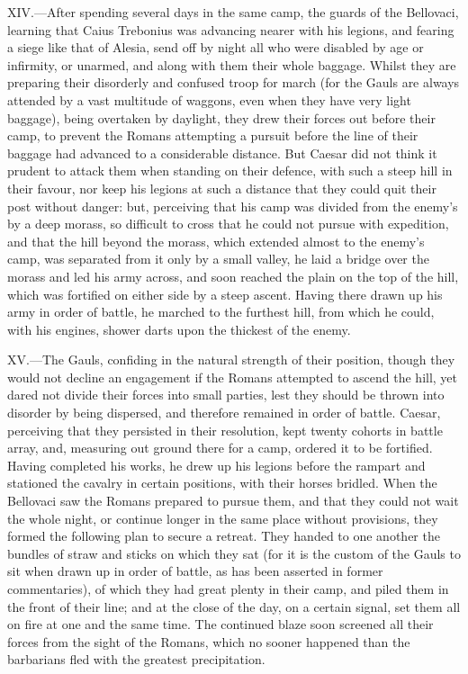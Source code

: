 XIV.—After spending several days in the same camp, the guards of the
Bellovaci, learning that Caius Trebonius was advancing nearer with his
legions, and fearing a siege like that of Alesia, send off by night all
who were disabled by age or infirmity, or unarmed, and along with them
their whole baggage. Whilst they are preparing their disorderly and
confused troop for march (for the Gauls are always attended by a vast
multitude of waggons, even when they have very light baggage), being
overtaken by daylight, they drew their forces out before their camp, to
prevent the Romans attempting a pursuit before the line of their baggage
had advanced to a considerable distance. But Caesar did not think it
prudent to attack them when standing on their defence, with such a steep
hill in their favour, nor keep his legions at such a distance that they
could quit their post without danger: but, perceiving that his camp was
divided from the enemy's by a deep morass, so difficult to cross that he
could not pursue with expedition, and that the hill beyond the morass,
which extended almost to the enemy's camp, was separated from it only by
a small valley, he laid a bridge over the morass and led his army
across, and soon reached the plain on the top of the hill, which was
fortified on either side by a steep ascent. Having there drawn up his
army in order of battle, he marched to the furthest hill, from which he
could, with his engines, shower darts upon the thickest of the enemy.

XV.—The Gauls, confiding in the natural strength of their position,
though they would not decline an engagement if the Romans attempted to
ascend the hill, yet dared not divide their forces into small parties,
lest they should be thrown into disorder by being dispersed, and
therefore remained in order of battle. Caesar, perceiving that they
persisted in their resolution, kept twenty cohorts in battle array, and,
measuring out ground there for a camp, ordered it to be fortified.
Having completed his works, he drew up his legions before the rampart
and stationed the cavalry in certain positions, with their horses
bridled. When the Bellovaci saw the Romans prepared to pursue them, and
that they could not wait the whole night, or continue longer in the same
place without provisions, they formed the following plan to secure a
retreat. They handed to one another the bundles of straw and sticks on
which they sat (for it is the custom of the Gauls to sit when drawn up
in order of battle, as has been asserted in former commentaries), of
which they had great plenty in their camp, and piled them in the front
of their line; and at the close of the day, on a certain signal, set
them all on fire at one and the same time. The continued blaze soon
screened all their forces from the sight of the Romans, which no sooner
happened than the barbarians fled with the greatest precipitation.

